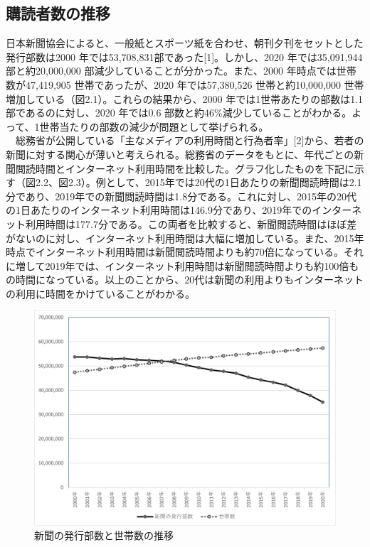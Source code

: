 \subsection{購読者数の推移}
日本新聞協会によると、一般紙とスポーツ紙を合わせ、朝刊夕刊をセットとした発行部数は2000 年では53,708,831部であった[1]。しかし、2020 年では35,091,944 部と約20,000,000 部減少していることが分かった。また、2000 年時点では世帯数が47,419,905 世帯であったが、2020 年では57,380,526 世帯と約10,000,000 世帯増加している（図2.1）。これらの結果から、2000 年では1世帯あたりの部数は1.1 部であるのに対し、2020 年では0.6 部数と約46\%減少していることがわかる。よって、1世帯当たりの部数の減少が問題として挙げられる。\\
　総務省が公開している「主なメディアの利用時間と行為者率」[2]から、若者の新聞に対する関心が薄いと考えられる。総務省のデータをもとに、年代ごとの新聞閲読時間とインターネット利用時間を比較した。グラフ化したものを下記に示す（図2.2、図2.3）。例として、2015年では20代の1日あたりの新聞閲読時間は2.1分であり、2019年での新聞閲読時間は1.8分である。これに対し、2015年の20代の1日あたりのインターネット利用時間は146.9分であり、2019年でのインターネット利用時間は177.7分である。この両者を比較すると、新聞閲読時間はほぼ差がないのに対し、インターネット利用時間は大幅に増加している。また、2015年時点でインターネット利用時間は新聞閲読時間よりも約70倍になっている。それに増して2019年では、インターネット利用時間は新聞閲読時間よりも約100倍もの時間になっている。以上のことから、20代は新聞の利用よりもインターネットの利用に時間をかけていることがわかる。
\newpage
\begin{figure}[htbp]
    \centering
    \includegraphics[keepaspectratio, scale=0.4]{images/newspaper4.png}
    \caption{新聞の発行部数と世帯数の推移}
    \label{fig:my_label}
\end{figure}

